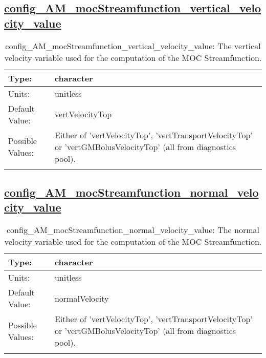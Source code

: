 \subsection[config\_AM\_mocStreamfunction\_vertical\_velocity\_value]{\hyperref[sec:nm_tab_AM_mocStreamfunction]{config\_AM\_mocStreamfunction\_vertical\_velocity\_value}}
\label{subsec:nm_sec_config_AM_mocStreamfunction_vertical_velocity_value}
\begin{center}
\begin{longtable}{| p{2.0in} || p{4.0in} |}
    \hline
    Type: & character \\
    \hline
    Units: & \si{unitless} \\
    \hline
    Default Value: & vertVelocityTop \\
    \hline
    Possible Values: & Either of 'vertVelocityTop', 'vertTransportVelocityTop' or 'vertGMBolusVelocityTop' (all from diagnostics pool). \\
    \hline
    \caption{config\_AM\_mocStreamfunction\_vertical\_velocity\_value: The vertical velocity variable used for the computation of the MOC Streamfunction.}
\end{longtable}
\end{center}
\subsection[config\_AM\_mocStreamfunction\_normal\_velocity\_value]{\hyperref[sec:nm_tab_AM_mocStreamfunction]{config\_AM\_mocStreamfunction\_normal\_velocity\_value}}
\label{subsec:nm_sec_config_AM_mocStreamfunction_normal_velocity_value}
\begin{center}
\begin{longtable}{| p{2.0in} || p{4.0in} |}
    \hline
    Type: & character \\
    \hline
    Units: & \si{unitless} \\
    \hline
    Default Value: & normalVelocity \\
    \hline
    Possible Values: & Either of 'vertVelocityTop', 'vertTransportVelocityTop' or 'vertGMBolusVelocityTop' (all from diagnostics pool). \\
    \hline
    \caption{config\_AM\_mocStreamfunction\_normal\_velocity\_value: The normal velocity variable used for the computation of the MOC Streamfunction.}
\end{longtable}
\end{center}

